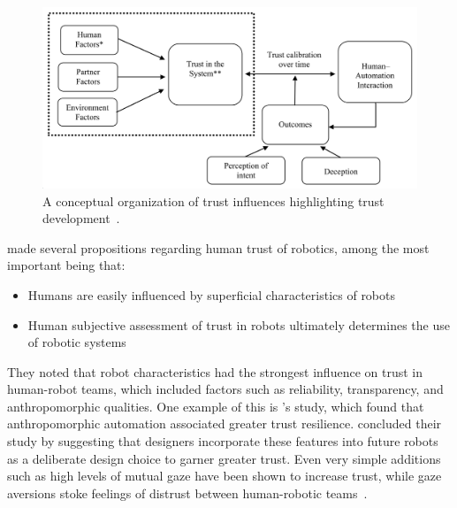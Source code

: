 \begin{figure}[b!]
    \begin{center}
        \includegraphics[width=0.8\linewidth]{figures/TradeStudy/figure4.png}
        \caption[A conceptual organization of trust influences highlighting trust development]{A conceptual organization of trust influences highlighting trust development~\citep{schaefer_meta-analysis_2016}.}
        \label{figure-hari:trust}
    \end{center}
\end{figure}

\citeauthor{ososky_building_2013} made several propositions regarding human trust of robotics, among the most important being that:
\begin{itemize}
    \item Humans are easily influenced by superficial characteristics of robots
    \item Human subjective assessment of trust in robots ultimately determines the use of robotic systems
\end{itemize}
They noted that robot characteristics had the strongest influence on trust in human-robot teams, which included factors such as reliability, transparency, and anthropomorphic qualities.
One example of this is \citeauthor{de_visser_almost_2016}'s \citeyear{de_visser_almost_2016} study, which found that anthropomorphic automation associated greater trust resilience.
\citeauthor{de_visser_almost_2016} concluded their study by suggesting that designers incorporate these features into future robots as a deliberate design choice to garner greater trust.
Even very simple additions such as high levels of mutual gaze have been shown to increase trust, while gaze aversions stoke feelings of distrust between human-robotic teams~\citep{admoni_social_2017}.

